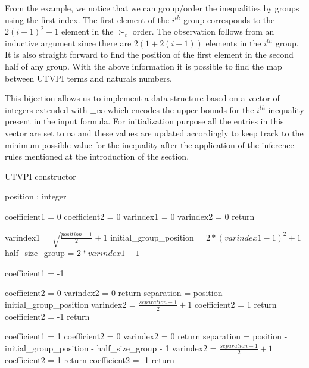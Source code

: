 From the example, we notice that we can group/order the inequalities by groups using the first
index. The first element of the $i^{th}$ group corresponds to the $2(i-1)^2 + 1$ element in the 
$\succ_t$ order. The observation follows from an inductive argument since there are 
$2(1 + 2(i-1))$ elements in the $i^{th}$ group. It is also straight forward to find the
position of the first element in the second half of any group. With the above information
it is possible to find the map between UTVPI terms and naturals numbers.

This bijection allows us to implement a data 
structure based on a vector of integers extended
with $\pm \infty$ which encodes the upper bounds 
for the $i^{th}$ inequality present in the 
input formula. For initialization purpose all 
the entries in this vector are set to
$\infty$ and these values are updated accordingly 
to keep track to the minimum possible value 
for the inequality after the application of the 
inference rules mentioned at the
introduction of the section.

\begin{algorithm}
  \caption{UTVPI constructor}
  \linespread{\separationline}\selectfont
  \begin{algorithmic}[2]
     {position : integer}

    \State coefficient1 = 0
    \State coefficient2 = 0
    \State varindex1 = 0
    \State varindex2 = 0
    \State return
    \EndIf

    \State varindex1 = $\sqrt{\frac{position - 1}{2}} + 1$
    \State initial\_group\_position = $2*(varindex1-1)^2 + 1$
    \State half\_size\_group = $2*varindex1-1$

    \State coefficient1 = -1

    \State coefficient2 = 0
    \State varindex2 = 0
    \State return
    \EndIf
    \State separation = position - initial\_group\_position
    \State varindex2 = $\frac{separation - 1}{2} + 1$
    \State coefficient2 = 1
    \State return
    \EndIf
    \State coefficient2 = -1
    \State return
    \EndIf

    \State coefficient1 = 1
    \State coefficient2 = 0
    \State varindex2 = 0
    \State return
    \EndIf
    \State separation = position - initial\_group\_position - half\_size\_group - 1
    \State varindex2 = $\frac{separation - 1}{2} + 1$
    \State coefficient2 = 1
    \State return
    \EndIf
    \State coefficient2 = -1
    \State return
    \EndProcedure
  \end{algorithmic}
\end{algorithm}

